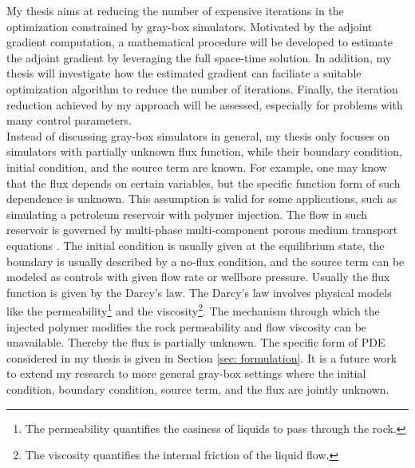 My thesis aims at reducing the number of expensive iterations in the optimization constrained by
gray-box simulators. 
Motivated by the adjoint gradient computation, a mathematical procedure will be developed to estimate the
adjoint gradient by leveraging the full space-time solution. In addition,
my thesis will investigate how the estimated gradient can faciliate a suitable 
optimization algorithm to reduce the number of iterations. 
Finally, the iteration reduction achieved by my approach will be assessed, especially 
for problems with many control parameters.\\


Instead of discussing gray-box simulators in general, my thesis only focuses on
simulators with partially unknown flux function, while their boundary condition,
initial condition, and the source term are known. For example, one may know that
the flux depends on certain variables, but the specific function form of such dependence is unknown.
This assumption is valid for some applications,
such as simulating a petroleum reservoir with polymer injection.
The flow in such reservoir is governed by multi-phase multi-component porous medium transport 
equations \cite{reservoir sim book}. The initial condition is usually given at the equilibrium state, the boundary
is usually described by a no-flux condition, and the source term can be modeled as controls
with given flow rate or wellbore pressure.
Usually the flux function is given by the Darcy's law.
The Darcy's law involves physical models like the permeability\footnote{The permeability quantifies the
easiness of liquids to pass through the rock.} and the viscosity\footnote{The viscosity quantifies the
internal friction of the liquid flow.}.
The mechanism through which the injected polymer modifies the rock permeability and flow viscosity can be unavailable. Thereby the flux is partially unknown.
The specific form of PDE considered in my thesis is given in Section \ref{sec: formulation}.
It is a future work to extend my research to more general gray-box settings where
the initial condition, boundary condition, source term, and the flux are jointly unknown.\\

